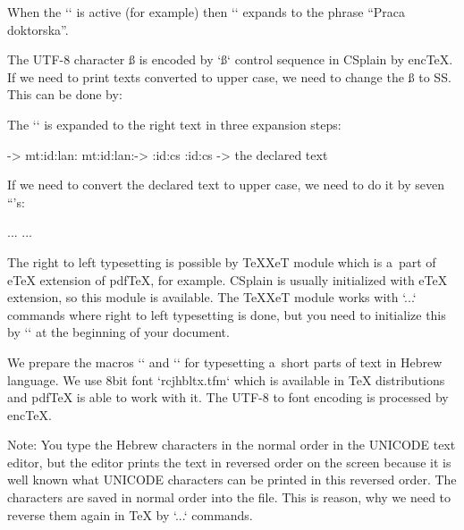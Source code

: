 When the `\pllang` is active (for example) then `` expands to the phrase “Praca doktorska”. 


 


The UTF-8 character ß is encoded by `\ss` control sequence in CSplain by encTeX. If we need to print texts converted to upper case, we need to change the ß to SS. This can be done by: 

\begtt
\def\Uppercase#1{\begingroup 
   \def\ss{SS}\uppercase{\edef\tmp{#1}}%
   \expandafter\endgroup\tmp 
} 
 
\Uppercase{Mainstraße} 
\endtt

 


The `` is expanded to the right text in three expansion steps: 

\begtt
{} -> \csname mt:id:\csname lan:\the\language\endcsname\endcsname 
\csname mt:id:\csname lan:\the\language\endcsname\endcsname -> \mt:id:cs 
\mt:id:cs -> the declared text 
\endtt


If we need to convert the declared text to upper case, we need to do it by seven `\expandafter`'s: 

\begtt
\def\exseven{\expandafter\expandafter\expandafter 
             \expandafter\expandafter\expandafter\expandafter} 
...\uppercase\exseven{\mtext{id}}... 
\endtt

 


The right to left typesetting is possible by TeXXeT module which is a~part of eTeX extension of pdfTeX, for example. CSplain is usually initialized with eTeX extension, so this module is available. The TeXXeT module works with `\beginR...\endR` commands where right to left typesetting is done, but you need to initialize this by `` at the beginning of your document. 



We prepare the macros `` and `` for typesetting a~short parts of text in Hebrew language. We use 8bit font `rcjhbltx.tfm` which is available in TeX distributions and pdfTeX is able to work with it. The UTF-8 to font encoding is processed by encTeX. 



Note: You type the Hebrew characters in the normal order in the UNICODE text editor, but the editor prints the text in reversed order on the screen because it is well known what UNICODE characters can be printed in this reversed order. The characters are saved in normal order into the file. This is reason, why we need to reverse them again in TeX by `\beginR...\endR` commands. 

